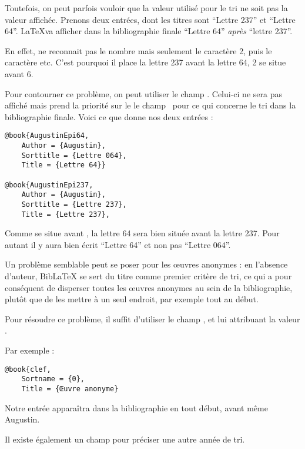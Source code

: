 Toutefois, on peut parfois vouloir que  la valeur utilisé pour le tri ne soit pas la valeur affichée. Prenons deux entrées, dont les titres sont \enquote{Lettre 237} et \enquote{Lettre 64}. \LaTeX va afficher dans la bibliographie finale
\enquote{Lettre 64} \emph{après} \enquote{lettre 237}. 

En effet,  ne reconnait pas le nombre  mais seulement le caractère {2}, puis le caractère  etc. C'est pourquoi il place la lettre 237 avant la lettre 64, 2 se situe avant 6.

Pour contourner ce problème, on peut utiliser le champ . Celui-ci ne sera pas affiché mais prend la priorité sur le le champ  pour ce qui concerne le tri dans la bibliographie finale.  Voici ce que donne nos deux entrées :
\begin{verbatim}
@book{AugustinEpi64,
	Author = {Augustin},
	Sorttitle = {Lettre 064},
	Title = {Lettre 64}}
	
@book{AugustinEpi237,
	Author = {Augustin},
	Sorttitle = {Lettre 237},
	Title = {Lettre 237},
\end{verbatim}

Comme  se situe avant , la lettre 64 sera bien située avant la lettre 237. Pour autant il y aura bien écrit \enquote{Lettre 64} et non pas \enquote{Lettre 064}.

Un problème semblable peut se poser pour les œuvres anonymes : en l'absence d'auteur, BibLaTeX se sert du titre comme premier critère de tri, ce qui a pour conséquent de disperser toutes les œuvres anonymes au sein de la bibliographie, plutôt que de les mettre à un seul endroit, par exemple tout au début.

Pour résoudre ce problème, il suffit d'utiliser le champ , et lui attribuant la valeur .

Par exemple :

\begin{verbatim}
@book{clef,
	Sortname = {0},
	Title = {Œuvre anonyme}
\end{verbatim}

Notre entrée  apparaîtra dans la bibliographie en tout début, avant même Augustin.

Il existe également un champ  pour préciser une autre année de tri. 